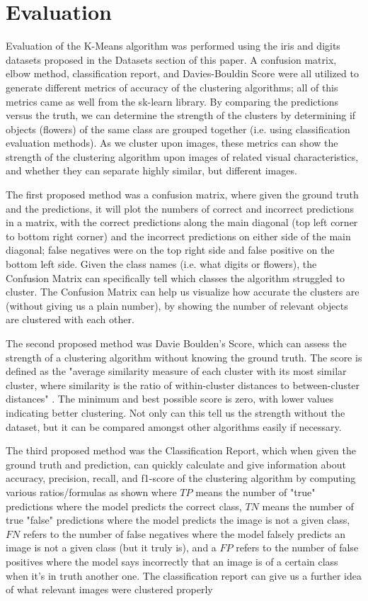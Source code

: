 \documentclass[10pt,twocolumn]{article}
\begin{document}
\section {Evaluation}

Evaluation of the K-Means algorithm was performed using the iris and digits datasets proposed in the Datasets section of this paper. A confusion matrix, elbow method, classification report, and Davies-Bouldin Score were all utilized to generate different metrics of accuracy of the clustering algorithms; all of this metrics came as well from the sk-learn library. By comparing the predictions versus the truth, we can determine the strength of the clusters by determining if objects (flowers) of the same class are grouped together (i.e. using classification evaluation methods). As we cluster upon images, these metrics can show the strength of the clustering algorithm upon images of related visual characteristics, and whether they can separate highly similar, but different images.

The first proposed method was a confusion matrix, where given the ground truth and the predictions, it will plot the numbers of correct and incorrect predictions in a matrix, with the correct predictions along the main diagonal (top left corner to bottom right corner) and the incorrect predictions on either side of the main diagonal; false negatives were on the top right side and false positive on the bottom left side. Given the class names (i.e. what digits or flowers), the Confusion Matrix can specifically tell which classes the algorithm struggled to cluster. The Confusion Matrix can help us visualize how accurate the clusters are (without giving us a plain number), by showing the number of relevant objects are clustered with each other. 

The second proposed method was Davie Boulden's Score, which can assess the strength of a clustering algorithm without knowing the ground truth. The score is defined as the "average similarity measure of each cluster with its most similar cluster, where similarity is the ratio of within-cluster distances to between-cluster distances" \cite{skLearn2020}. The minimum and best possible score is zero, with lower values indicating better clustering. Not only can this tell us the strength without the dataset, but it can be compared amongst other algorithms easily if necessary.

The third proposed method was the Classification Report, which when given the ground truth and prediction, can quickly calculate and give information about accuracy, precision, recall, and f1-score of the clustering algorithm by computing various ratios/formulas as shown where \(TP\) means the number of "true" predictions where the model predicts the correct class, \(TN\) means the number of true "false" predictions where the model predicts the image is not a given class, \(FN\) refers to the number of false negatives where the model falsely predicts an image is not a given class (but it truly is), and a \(FP\) refers to the number of false positives where the model says incorrectly that an image is of a certain class when it's in truth another one. The classification report can give us a further idea of what relevant images were clustered properly
\end{document}
